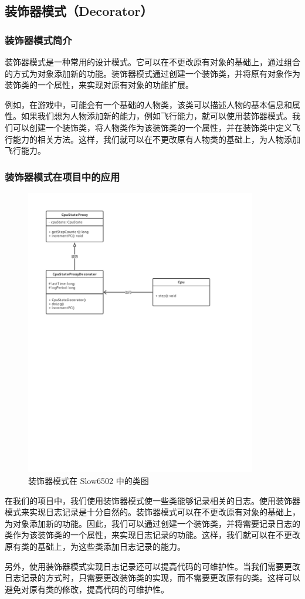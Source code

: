 \subsection{装饰器模式（Decorator）}

\subsubsection{装饰器模式简介}


装饰器模式是一种常用的设计模式。它可以在不更改原有对象的基础上，通过组合的方式为对象添加新的功能。装饰器模式通过创建一个装饰类，并将原有对象作为装饰类的一个属性，来实现对原有对象的功能扩展。

例如，在游戏中，可能会有一个基础的人物类，该类可以描述人物的基本信息和属性。如果我们想为人物添加新的能力，例如飞行能力，就可以使用装饰器模式。我们可以创建一个装饰类，将人物类作为该装饰类的一个属性，并在装饰类中定义飞行能力的相关方法。这样，我们就可以在不更改原有人物类的基础上，为人物添加飞行能力。

\subsubsection{装饰器模式在项目中的应用}

\begin{figure}[htb]
  \centering
  \includegraphics[width=0.9\textwidth]{figures/装饰器模式.pdf}
  \caption{装饰器模式在 Slow6502 中的类图}
\end{figure}

在我们的项目中，我们使用装饰器模式使一些类能够记录相关的日志。使用装饰器模式来实现日志记录是十分自然的。装饰器模式可以在不更改原有对象的基础上，为对象添加新的功能。因此，我们可以通过创建一个装饰类，并将需要记录日志的类作为该装饰类的一个属性，来实现日志记录的功能。这样，我们就可以在不更改原有类的基础上，为这些类添加日志记录的能力。

另外，使用装饰器模式实现日志记录还可以提高代码的可维护性。当我们需要更改日志记录的方式时，只需要更改装饰类的实现，而不需要更改原有的类。这样可以避免对原有类的修改，提高代码的可维护性。
